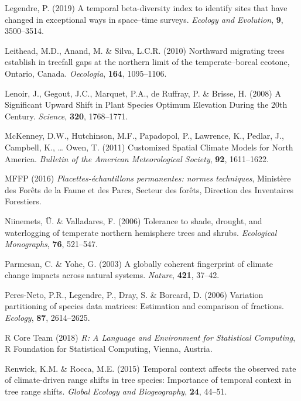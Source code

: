 \documentclass[a4paperpaper,]{article}
\begin{document}
\leavevmode\hypertarget{ref-legendre_temporal_2019}{}%
Legendre, P. (2019) A temporal beta-diversity index to identify sites
that have changed in exceptional ways in space--time surveys.
\emph{Ecology and Evolution}, \textbf{9}, 3500--3514.

\leavevmode\hypertarget{ref-leithead_northward_2010}{}%
Leithead, M.D., Anand, M. \& Silva, L.C.R. (2010) Northward migrating
trees establish in treefall gaps at the northern limit of the
temperate--boreal ecotone, Ontario, Canada. \emph{Oecologia},
\textbf{164}, 1095--1106.

\leavevmode\hypertarget{ref-lenoir_significant_2008}{}%
Lenoir, J., Gegout, J.C., Marquet, P.A., de Ruffray, P. \& Brisse, H.
(2008) A Significant Upward Shift in Plant Species Optimum Elevation
During the 20th Century. \emph{Science}, \textbf{320}, 1768--1771.

\leavevmode\hypertarget{ref-mckenney_customized_2011}{}%
McKenney, D.W., Hutchinson, M.F., Papadopol, P., Lawrence, K., Pedlar,
J., Campbell, K., \ldots{} Owen, T. (2011) Customized Spatial Climate
Models for North America. \emph{Bulletin of the American Meteorological
Society}, \textbf{92}, 1611--1622.

\leavevmode\hypertarget{ref-mffp_placettes-echantillons_2016}{}%
MFFP (2016) \emph{Placettes-échantillons permanentes: normes
techniques}, Ministère des Forêts de la Faune et des Parcs, Secteur des
forêts, Direction des Inventaires Forestiers.

\leavevmode\hypertarget{ref-niinemets_tolerance_2006}{}%
Niinemets, Ü. \& Valladares, F. (2006) Tolerance to shade, drought, and
waterlogging of temperate northern hemisphere trees and shrubs.
\emph{Ecological Monographs}, \textbf{76}, 521--547.

\leavevmode\hypertarget{ref-parmesan_globally_2003}{}%
Parmesan, C. \& Yohe, G. (2003) A globally coherent fingerprint of
climate change impacts across natural systems. \emph{Nature},
\textbf{421}, 37--42.

\leavevmode\hypertarget{ref-peres-neto_variation_2006}{}%
Peres-Neto, P.R., Legendre, P., Dray, S. \& Borcard, D. (2006) Variation
partitioning of species data matrices: Estimation and comparison of
fractions. \emph{Ecology}, \textbf{87}, 2614--2625.

\leavevmode\hypertarget{ref-r_core_team_r_2018}{}%
R Core Team (2018) \emph{R: A Language and Environment for Statistical
Computing}, R Foundation for Statistical Computing, Vienna, Austria.

\leavevmode\hypertarget{ref-renwick_temporal_2015}{}%
Renwick, K.M. \& Rocca, M.E. (2015) Temporal context affects the
observed rate of climate-driven range shifts in tree species: Importance
of temporal context in tree range shifts. \emph{Global Ecology and
Biogeography}, \textbf{24}, 44--51.
\end{document}
